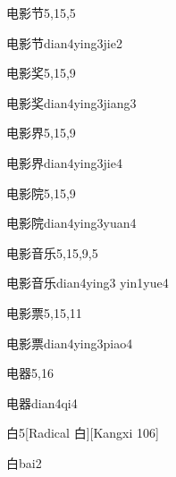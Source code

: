 \begin{entry}{电影节}{5,15,5}
  \begin{phonetics}{电影节}{dian4ying3jie2}
  \end{phonetics}
\end{entry}

\begin{entry}{电影奖}{5,15,9}
  \begin{phonetics}{电影奖}{dian4ying3jiang3}
  \end{phonetics}
\end{entry}

\begin{entry}{电影界}{5,15,9}
  \begin{phonetics}{电影界}{dian4ying3jie4}
  \end{phonetics}
\end{entry}

\begin{entry}{电影院}{5,15,9}
  \begin{phonetics}{电影院}{dian4ying3yuan4}
  \end{phonetics}
\end{entry}

\begin{entry}{电影音乐}{5,15,9,5}
  \begin{phonetics}{电影音乐}{dian4ying3 yin1yue4}
  \end{phonetics}
\end{entry}

\begin{entry}{电影票}{5,15,11}
  \begin{phonetics}{电影票}{dian4ying3piao4}
  \end{phonetics}
\end{entry}

\begin{entry}{电器}{5,16}
  \begin{phonetics}{电器}{dian4qi4}
  \end{phonetics}
\end{entry}

\begin{entry}{白}{5}[Radical 白][Kangxi 106]
  \begin{phonetics}{白}{bai2}
  \end{phonetics}
\end{entry}

